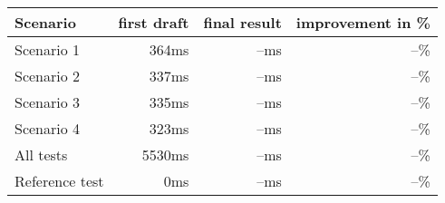 \begin{tabular}[t]{l|rrr}
 Scenario   & first draft & final result & improvement in \% \\
 \hline
 Scenario 1	&  364ms & --ms & --\% \\
 Scenario 2	&  337ms & --ms & --\% \\
 Scenario 3	&  335ms & --ms & --\% \\
 Scenario 4	&  323ms & --ms & --\% \\
 All tests	& 5530ms & --ms & --\% \\
 Reference test	&    0ms & --ms & --\% \\
\end{tabular}

